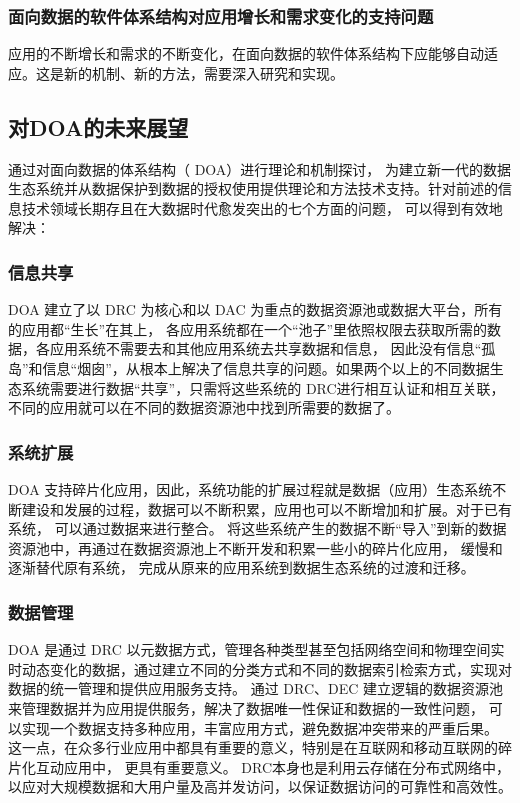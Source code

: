 \documentclass[article]{BJTU-thesis}
\begin{document}
	\subsubsection{面向数据的软件体系结构对应用增长和需求变化的支持问题}
	应用的不断增长和需求的不断变化，在面向数据的软件体系结构下应能够自动适应。这是新的机制、新的方法，需要深入研究和实现。
	
	\subsection{对DOA的未来展望}
	通过对面向数据的体系结构（ DOA）进行理论和机制探讨， 为建立新一代的数据生态系统并从数据保护到数据的授权使用提供理论和方法技术支持。针对前述的信息技术领域长期存且在大数据时代愈发突出的七个方面的问题\cite{za}， 可以得到有效地解决：
	
	\subsubsection{信息共享}
	DOA 建立了以 DRC 为核心和以 DAC 为重点的数据资源池或数据大平台，所有的应用都“生长”在其上， 各应用系统都在一个“池子”里依照权限去获取所需的数据，各应用系统不需要去和其他应用系统去共享数据和信息， 因此没有信息“孤岛”和信息“烟囱”\cite{ze}\cite{zf}，从根本上解决了信息共享的问题。如果两个以上的不同数据生态系统需要进行数据“共享”，只需将这些系统的 DRC进行相互认证和相互关联，不同的应用就可以在不同的数据资源池中找到所需要的数据了。
	
	\subsubsection{系统扩展}
	DOA 支持碎片化应用，因此，系统功能的扩展过程就是数据（应用）生态系统不断建设和发展的过程，数据可以不断积累，应用也可以不断增加和扩展。对于已有系统， 可以通过数据来进行整合。 将这些系统产生的数据不断“导入”到新的数据资源池中，再通过在数据资源池上不断开发和积累一些小的碎片化应用， 缓慢和逐渐替代原有系统， 完成从原来的应用系统到数据生态系统的过渡和迁移。
	
	\subsubsection{数据管理}
	DOA 是通过 DRC 以元数据方式，管理各种类型甚至包括网络空间和物理空间实时动态变化的数据，通过建立不同的分类方式和不同的数据索引检索方式，实现对数据的统一管理和提供应用服务支持。 通过 DRC、DEC 建立逻辑的数据资源池来管理数据并为应用提供服务，解决了数据唯一性保证和数据的一致性问题， 可以实现一个数据支持多种应用，丰富应用方式，避免数据冲突带来的严重后果。 这一点，在众多行业应用中都具有重要的意义，特别是在互联网和移动互联网的碎片化互动应用中， 更具有重要意义。 DRC本身也是利用云存储在分布式网络中，以应对大规模数据和大用户量及高并发访问，以保证数据访问的可靠性和高效性\cite{DeanMapReduce}\cite{gamesfromwithin.com}。
	
\end{document}
